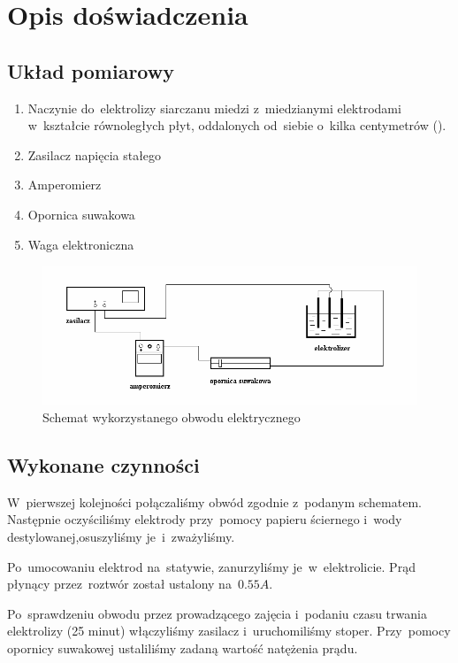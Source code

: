 \documentclass{fizraport}
\begin{document}
\newpage %
\addtocounter{page}{2}%



\section{Opis doświadczenia}
\subsection{Układ pomiarowy}
\begin{enumerate}
    \item Naczynie do~elektrolizy siarczanu miedzi   z~miedzianymi elektrodami w~kształcie równoległych płyt, oddalonych od~siebie o~kilka centymetrów ().
    \item Zasilacz napięcia stałego
    \item Amperomierz
    \item Opornica suwakowa
    \item Waga elektroniczna
\end{enumerate}
\begin{figure}[!htb]
\centerline{\includegraphics[scale=0.7]{5/schemat-obw.png}}
\caption{Schemat wykorzystanego obwodu elektrycznego}
\label{fig:schemat}
\end{figure}
\subsection{Wykonane czynności}
W~pierwszej kolejności połączaliśmy obwód zgodnie z~podanym schematem. Następnie oczyściliśmy elektrody przy~pomocy papieru ściernego i~wody destylowanej,osuszyliśmy je~i~zważyliśmy.

Po~umocowaniu elektrod na~statywie, zanurzyliśmy je~w~elektrolicie. Prąd płynący przez~roztwór został ustalony na~$0.55A$.

Po~sprawdzeniu obwodu przez prowadzącego zajęcia i~podaniu czasu trwania elektrolizy (25 minut) włączyliśmy zasilacz i~uruchomiliśmy stoper. Przy~pomocy opornicy suwakowej ustaliliśmy zadaną wartość natężenia prądu. 
\end{document}
